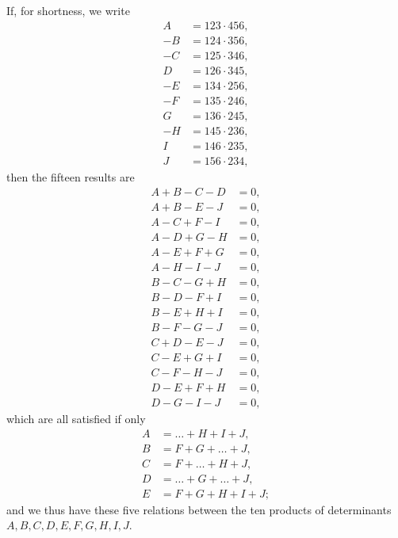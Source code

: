 \documentclass[11pt,a4paper]{article}
\begin{document}
If, for shortness, we write
\begin{align*}
A &= 123\cdot 456,\\
-B &= 124\cdot 356,\\
-C &= 125\cdot 346,\\
D &= 126\cdot 345,\\
-E &= 134\cdot 256,\\
-F &= 135\cdot 246,\\
G &= 136\cdot 245,\\
-H &= 145\cdot 236,\\
I &= 146\cdot 235,\\
J &= 156\cdot 234,
\end{align*}
then the fifteen results are
\begin{align*}
A + B - C - D &= 0,\\
A + B - E - J &= 0,\\
A - C + F - I &= 0,\\
A - D + G - H &= 0,\\
A - E + F + G &= 0,\\
A - H - I - J &= 0,\\
B - C - G + H &= 0,\\
B - D - F + I &= 0,\\
B - E + H + I &= 0,\\
B - F - G - J &= 0,\\
C + D - E - J &= 0,\\
C - E + G + I &= 0,\\
C - F - H - J &= 0,\\
D - E + F + H &= 0,\\
D - G - I - J &= 0,
\end{align*}
which are all satisfied if only
\begin{align*}
A &= \ldots + H + I + J,\\
B &= F + G + \ldots + J,\\
C &= F + \ldots + H + J,\\
D &= \ldots + G + \ldots + J,\\
E &= F + G + H + I + J;
\end{align*}
and we thus have these five relations between the ten products of determinants $A, B, C, D, E, F, G, H, I, J$.

\newpage


\end{document}
